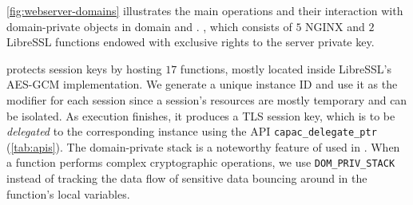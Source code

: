 


\autoref{fig:webserver-domains} illustrates the main operations and their interaction with domain-private objects in domain \domhs and \domses.
\domhs, which consists of $5$ NGINX and $2$ LibreSSL functions endowed with exclusive rights to the server private key.


\domses protects session keys by hosting $17$ functions,  mostly located inside LibreSSL's AES-GCM implementation.
We generate a unique instance ID and use it as the modifier for each session since a session's resources are mostly temporary and can be isolated.
As \domhs execution finishes, it produces a TLS session key, which is to be \emph{delegated} to the corresponding \domses instance using the API \texttt{capac\_delegate\_ptr} (\autoref{tab:apis}).
The domain-private stack  is a noteworthy feature of \thename used in \domses.
When a function performs complex cryptographic operations, we use \texttt{DOM\_PRIV\_STACK} instead of tracking the data flow of sensitive data bouncing around in the function's local variables.



